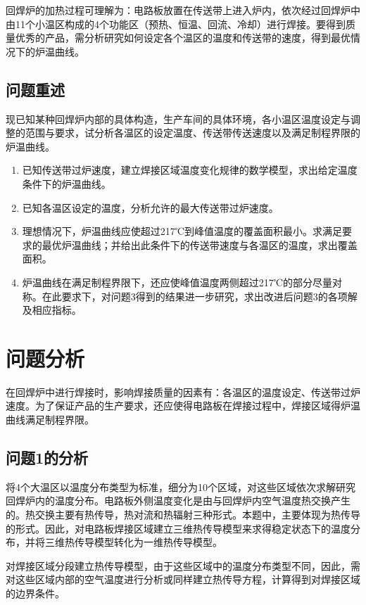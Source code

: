 \documentclass[withoutpreface,bwprint]{cumcmthesis} %
\numberwithin{equation}{subsection}
\begin{document}
回焊炉的加热过程可理解为：电路板放置在传送带上进入炉内，依次经过回焊炉中由11个小温区构成的4个功能区（预热、恒温、回流、冷却）进行焊接。要得到质量优秀的产品，需分析研究如何设定各个温区的温度和传送带的速度，得到最优情况下的炉温曲线。

\subsection{问题重述}
现已知某种回焊炉内部的具体构造，生产车间的具体环境，各小温区温度设定与调整的范围与要求，试分析各温区的设定温度、传送带传送速度以及满足制程界限的炉温曲线。

\begin{enumerate}[label=(\arabic*)]
\item  已知传送带过炉速度，建立焊接区域温度变化规律的数学模型，求出给定温度条件下的炉温曲线。
	
\item  已知各温区设定的温度，分析允许的最大传送带过炉速度。
	
\item  理想情况下，炉温曲线应使超过217℃到峰值温度的覆盖面积最小。求满足要求的最优炉温曲线；并给出此条件下的传送带速度与各温区的温度，求出覆盖面积。
	
\item 炉温曲线在满足制程界限下，还应使峰值温度两侧超过217℃的部分尽量对称。在此要求下，对问题3得到的结果进一步研究，求出改进后问题3的各项解及相应指标。
\end{enumerate}




\section{问题分析}
在回焊炉中进行焊接时，影响焊接质量的因素有：各温区的温度设定、传送带过炉速度。为了保证产品的生产要求，还应使得电路板在焊接过程中，焊接区域得炉温曲线满足制程界限。

\subsection{问题1的分析}
将4个大温区以温度分布类型为标准，细分为10个区域，对这些区域依次求解研究回焊炉内的温度分布。电路板外侧温度变化是由与回焊炉内空气温度热交换产生的。热交换主要有热传导，热对流和热辐射三种形式。本题中，主要体现为热传导的形式。因此，对电路板焊接区域建立三维热传导模型来求得稳定状态下的温度分布，并将三维热传导模型转化为一维热传导模型。

对焊接区域分段建立热传导模型，由于这些区域中的温度分布类型不同，因此，需对这些区域内部的空气温度进行分析或同样建立热传导方程，计算得到对焊接区域的边界条件。
\end{document}
